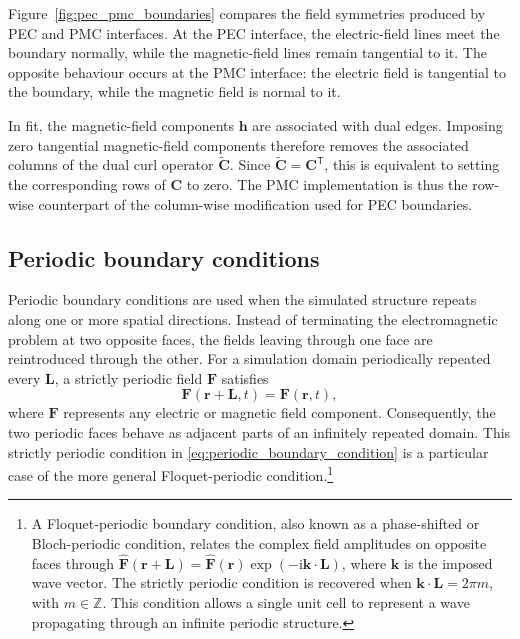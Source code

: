 Figure~\ref{fig:pec_pmc_boundaries} compares the field symmetries produced by PEC and PMC interfaces. At the PEC interface, the electric-field lines meet the boundary normally, while the magnetic-field lines remain tangential to it. The opposite behaviour occurs at the PMC interface: the electric field is tangential to the boundary, while the magnetic field is normal to it.

In \gls{fit}, the magnetic-field components $\mathbf{h}$ are associated with dual edges. Imposing zero tangential magnetic-field components therefore removes the associated columns of the dual curl operator $\widetilde{\mathbf{C}}$. Since $\widetilde{\mathbf{C}}=\mathbf{C}^{\mathsf{T}}$, this is equivalent to setting the corresponding rows of $\mathbf{C}$ to zero. The PMC implementation is thus the row-wise counterpart of the column-wise modification used for PEC boundaries.


\subsection{Periodic boundary conditions}
\label{sec:bc_periodic}

Periodic boundary conditions are used when the simulated structure repeats along one or more spatial directions. Instead of terminating the electromagnetic problem at two opposite faces, the fields leaving through one face are reintroduced through the other. For a simulation domain periodically repeated every $\mathbf{L}$, a strictly periodic field $\mathbf{F}$ satisfies
%
\begin{equation}
\mathbf{F}(\mathbf{r}+\mathbf{L},t)
=
\mathbf{F}(\mathbf{r},t),
\label{eq:periodic_boundary_condition}
\end{equation}
%
where $\mathbf{F}$ represents any electric or magnetic field component. Consequently, the two periodic faces behave as adjacent parts of an infinitely repeated domain. This strictly periodic condition in \ref{eq:periodic_boundary_condition} is a particular case of the more general Floquet-periodic condition.\footnote{A Floquet-periodic boundary condition, also known as a phase-shifted or Bloch-periodic condition, relates the complex field amplitudes on opposite faces through $\widehat{\mathbf{F}}(\mathbf{r}+\mathbf{L}) =\widehat{\mathbf{F}}(\mathbf{r})
\exp(-\mathrm{i}\mathbf{k}\cdot\mathbf{L})$, where $\mathbf{k}$ is the imposed
wave vector. The strictly periodic condition is recovered when $\mathbf{k}\cdot\mathbf{L}=2\pi m$, with $m\in\mathbb{Z}$. This condition allows a single unit cell to represent a wave propagating through an infinite periodic structure.}

